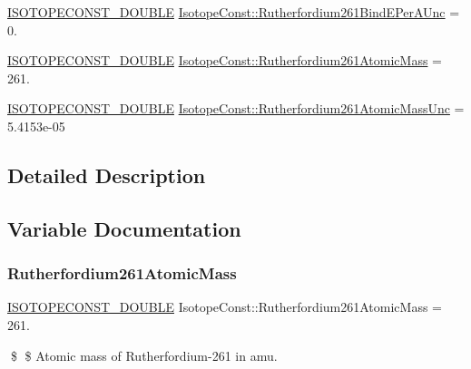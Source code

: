 \begin{DoxyCompactItemize}
\item 
\mbox{\hyperlink{group___isotope_const-_macros_ga8f45a7272ce02c0b4c65c44636ed719a}{I\+S\+O\+T\+O\+P\+E\+C\+O\+N\+S\+T\+\_\+\+D\+O\+U\+B\+LE}} \mbox{\hyperlink{group___isotope_const-_rutherfordium-_rf261_ga6b6e7154413f758b1534a326da564d20}{Isotope\+Const\+::\+Rutherfordium261\+Bind\+E\+Per\+A\+Unc}} = 0.
\item 
\mbox{\hyperlink{group___isotope_const-_macros_ga8f45a7272ce02c0b4c65c44636ed719a}{I\+S\+O\+T\+O\+P\+E\+C\+O\+N\+S\+T\+\_\+\+D\+O\+U\+B\+LE}} \mbox{\hyperlink{group___isotope_const-_rutherfordium-_rf261_ga531e888a7b4014216b06952280c8744f}{Isotope\+Const\+::\+Rutherfordium261\+Atomic\+Mass}} = 261.
\item 
\mbox{\hyperlink{group___isotope_const-_macros_ga8f45a7272ce02c0b4c65c44636ed719a}{I\+S\+O\+T\+O\+P\+E\+C\+O\+N\+S\+T\+\_\+\+D\+O\+U\+B\+LE}} \mbox{\hyperlink{group___isotope_const-_rutherfordium-_rf261_gac923bc25241659f9dcb89cbf8991685d}{Isotope\+Const\+::\+Rutherfordium261\+Atomic\+Mass\+Unc}} = 5.\+4153e-\/05
\end{DoxyCompactItemize}


\subsection{Detailed Description}


\subsection{Variable Documentation}
\mbox{\label{group___isotope_const-_rutherfordium-_rf261_ga531e888a7b4014216b06952280c8744f}} 
\subsubsection{\texorpdfstring{Rutherfordium261\+Atomic\+Mass}{Rutherfordium261AtomicMass}}
{\footnotesize\ttfamily \mbox{\hyperlink{group___isotope_const-_macros_ga8f45a7272ce02c0b4c65c44636ed719a}{I\+S\+O\+T\+O\+P\+E\+C\+O\+N\+S\+T\+\_\+\+D\+O\+U\+B\+LE}} Isotope\+Const\+::\+Rutherfordium261\+Atomic\+Mass = 261.}

\$ \$ Atomic mass of Rutherfordium-\/261 in amu. \mbox{\label{group___isotope_const-_rutherfordium-_rf261_gac923bc25241659f9dcb89cbf8991685d}} 
